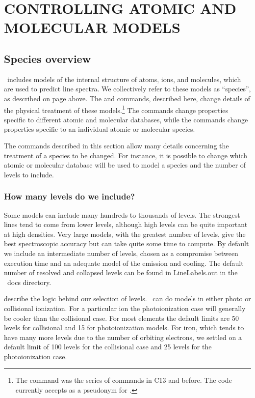 \chapter{CONTROLLING ATOMIC AND MOLECULAR MODELS}
\label{sec:ControllingAtomicModels}

\section{Species overview}

\Cloudy\ includes models of the internal structure of atoms, ions, and molecules,
which are used to predict line spectra.
We collectively refer to these models as ``species'', as described on page
\pageref{sec:SpeciesDefine} above.
The  and  commands, described here,
change details of the physical treatment of these 
models.\footnote{The  command was the 
 series of commands in C13 and before.  
The code currently accepts  as a
pseudonym for .}  The  commands change
properties specific to different atomic and molecular databases, while the 
commands change properties specific to an individual atomic or molecular species.

The commands described in this section allow many details concerning the treatment
of a species to be changed. 
For instance, it is possible to change which atomic or molecular database will be used to model a species
and the number of levels to include.

\subsection{How many levels do we include?}
Some models can include many hundreds to thousands of levels.
The strongest lines tend to come from lower levels, although
high levels can be quite important at high densities.
Very large models, with the greatest number of levels, give the best spectroscopic accuracy
but can take quite some time to compute.
By default we include an intermediate number of levels,
chosen as a compromise between execution time and 
an adequate model of the emission and cooling.
The default number of resolved and collapsed levels can be
found in LineLabels.out in the \Cloudy\ docs directory.

\citet{2013MNRAS.429.3133L} describe the logic behind our selection of levels.
\Cloudy\ can do models in either photo or collisional ionization.
For a particular ion the photoionization case will generally be cooler than the collisional case.
For most elements the default limits are 50 levels for collisional and 15 for photoionization models.
For iron, which tends to have many more levels due to the number of orbiting electrons,
we settled on a default limit of 100 levels for the collisional case
and 25 levels for the photoionization case.

